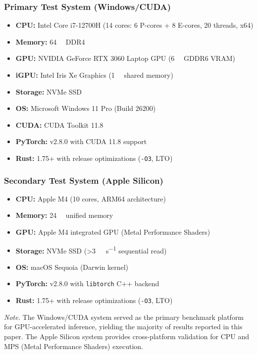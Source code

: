 \documentclass[10pt,twocolumn,a4paper]{article}
\theoremstyle{definition}
\theoremstyle{plain}
\begin{document}
\subsubsection{Primary Test System (Windows/CUDA)}
\begin{itemize}
    \item \textbf{CPU:} Intel Core i7-12700H (\num{14} cores: \num{6} P-cores + \num{8} E-cores, \num{20} threads, x64)
    \item \textbf{Memory:} \SI{64}{\giga\byte} DDR4
    \item \textbf{GPU:} NVIDIA GeForce RTX 3060 Laptop GPU (\SI{6}{\giga\byte} GDDR6 VRAM)
    \item \textbf{iGPU:} Intel Iris Xe Graphics (\SI{1}{\giga\byte} shared memory)
    \item \textbf{Storage:} NVMe SSD
    \item \textbf{OS:} Microsoft Windows 11 Pro (Build 26200)
    \item \textbf{CUDA:} CUDA Toolkit 11.8
    \item \textbf{PyTorch:} v2.8.0 with CUDA 11.8 support
    \item \textbf{Rust:} 1.75+ with release optimizations (\texttt{-O3}, LTO)
\end{itemize}

\subsubsection{Secondary Test System (Apple Silicon)}
\begin{itemize}
    \item \textbf{CPU:} Apple M4 (\num{10} cores, ARM64 architecture)
    \item \textbf{Memory:} \SI{24}{\giga\byte} unified memory
    \item \textbf{GPU:} Apple M4 integrated GPU (Metal Performance Shaders)
    \item \textbf{Storage:} NVMe SSD (\SI{>3}{\giga\byte\per\second} sequential read)
    \item \textbf{OS:} macOS Sequoia (Darwin kernel)
    \item \textbf{PyTorch:} v2.8.0 with \texttt{libtorch} C++ backend
    \item \textbf{Rust:} 1.75+ with release optimizations (\texttt{-O3}, LTO)
\end{itemize}

\noindent\textit{Note.} The Windows/CUDA system served as the primary benchmark platform for GPU-accelerated inference, yielding the majority of results reported in this paper. The Apple Silicon system provides cross-platform validation for CPU and MPS (Metal Performance Shaders) execution.
\end{document}
